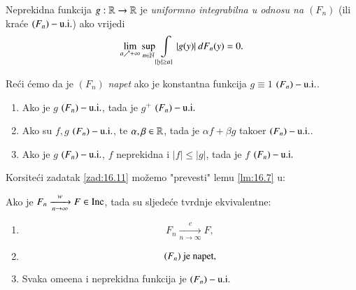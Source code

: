 \begin{defn}    \label{defn:16.10}
    Neprekidna funkcija $g: \mathbb{R} \to \mathbb{R}$ je \emph{uniformno integrabilna u odnosu na $(F_n)$} (ili kra\' ce \emph{$(F_n)-\mathrm{u.i.}$}) ako vrijedi
    \begin{equation*}
        \lim\limits_{a \nearrow +\infty} \sup\limits_{n \in \mathbb{N}} \int\limits_{\{|y| \geq a\}} |g (y)| \: d F_n (y) = 0.
    \end{equation*}
    
    Re\' ci \' cemo da je $(F_n)$ \emph{napet} ako je konstantna funkcija $g \equiv 1$ $(F_n)-\mathrm{u.i.}$.
\end{defn}

\begin{zad} \label{zad:16.11}
    \begin{enumerate}[label=(\roman*)]
        \item \label{zad:16.11.1}
        Ako je $g$ $(F_n)-\mathrm{u.i.}$, tada je $g^+$ $(F_n)-\mathrm{u.i.}$
        \item \label{zad:16.11.2}
        Ako su $f, g$ $(F_n)-\mathrm{u.i.}$, te $\alpha, \beta \in \mathbb{R}$, tada je $\alpha f + \beta g$ tako\dj er $(F_n)-\mathrm{u.i.}$.
        \item \label{zad:16.11.3}
        Ako je $g$ $(F_n)-\mathrm{u.i.}$, $f$ neprekidna i $|f| \leq |g|$, tada je $f$ $(F_n)-\mathrm{u.i.}$ 
    \end{enumerate}
\end{zad}

Korsite\' ci zadatak \ref{zad:16.11} mo\v zemo "prevesti" lemu \ref{lm:16.7} u:

\begin{kor} \label{kor:16.12}
    Ako je $F_n \xrightarrow[n \to \infty]{w} F \in \mathrm{Inc}$, tada su sljede\' ce tvrdnje ekvivalentne:
    \begin{enumerate}[label=(\roman*)]
        \item \label{kor:16.12.1}
        \begin{equation*}
            F_n \xrightarrow[n \to \infty]{c} F,
        \end{equation*}
        \item   \label{kor:16.12.2}
        \begin{equation*}
            (F_n) \textnormal{ je napet},
        \end{equation*}
        \item   \label{kor:16.12.3}
        Svaka ome\dj ena i neprekidna funkcija je $(F_n)-\mathrm{u.i.}$
    \end{enumerate}
\end{kor}

